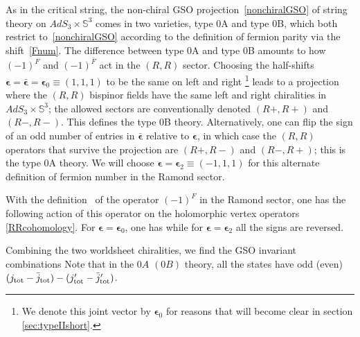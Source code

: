 \documentclass[12pt]{article}
\def\epsilonb{{\boldsymbol\epsilon}}
\def\tot{{\rm tot}}
\newcommand{\bS}{{\mathbb S}}
\numberwithin{equation}{section}
\begin{document}
As in the critical string, the non-chiral GSO projection~\eqref{nonchiralGSO} of string theory on $AdS_3\times \bS^3$ comes in two varieties, type 0A and type 0B, which both restrict to~\eqref{nonchiralGSO} according to the definition of fermion parity via the shift~\eqref{Fnum}.  The difference between type 0A and type 0B amounts to how $(-1)^F$ and $(-1)^{\bar F}$ act in the $(\!R,\!R)$ sector. Choosing the half-shifts $\epsilonb=\bar\epsilonb=\epsilonb_0\equiv(1,1,1)$ to be the same on left and right%
\footnote{We denote this joint vector by $\epsilonb_0$ for reasons that will become clear in section \ref{sec:typeIIshort}.} leads to a projection where the $(\!R,\!R)$ bispinor fields have the same left and right chiralities in $AdS_3\times \bS^3$; the allowed sectors are conventionally denoted $(R+,R+)$ and $(R-,R-)$.  This defines the type 0B theory.  Alternatively, one can flip the sign of an odd number of entries in $\bar\epsilonb$ relative to $\epsilonb$, in which case the $(\!R,\!R)$ operators that survive the projection are $(R+,R-)$ and $(R-,R+)$; this is the type 0A theory.  We will choose $\epsilonb=\epsilonb_2\equiv (-1,1,1)$ for this alternate definition of fermion number in the Ramond sector. 

With the definition \Fnum\ of the operator $(-1)^F$ in the Ramond sector, one has the following action of this operator on the holomorphic vertex operators \eqref{RRcohomology}. For $\epsilonb=\epsilonb_0$, one has   
while for $\epsilonb=\epsilonb_2$ all the signs are reversed.

Combining the two worldsheet chiralities, we find the GSO invariant combinations
Note that in the $0A$ $(0B)$ theory, all the states have odd (even) $(j_\tot-\bar j_\tot)-(j'_\tot-\bar j'_\tot)$.


\end{document}
